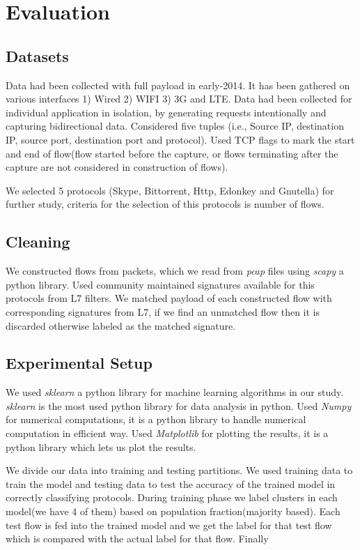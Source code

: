 \documentclass[conference]{IEEEtran}
\begin{document}
\section{Evaluation}
\label{sec:eval}
\subsection{Datasets}
Data had been collected with full payload in early-2014. It has been gathered on various interfaces 1) Wired 2) WIFI 3) 3G and LTE. Data had been collected for individual application in isolation, by generating requests intentionally and capturing bidirectional data.  Considered five tuples (i.e., Source IP, destination IP, source port, destination port and protocol). Used TCP flags to mark the start and end of flow(flow started before the capture, or flows terminating after the capture are not considered in construction of flows). 

We selected 5 protocols (Skype, Bittorrent, Http, Edonkey and Gnutella) for further study, criteria for the selection of this protocols is number of flows. 
\subsection{Cleaning}
We constructed flows from packets, which we read from \emph{pcap} files using \emph{scapy} a python library. Used community maintained signatures\cite{} available for this protocols from L7 filters. We matched payload of each constructed flow with corresponding signatures from L7, if we find an unmatched flow then it is discarded otherwise labeled as the matched signature.

\subsection{Experimental Setup}
We used \emph{sklearn} a python library for machine learning algorithms in our study. \emph{sklearn} is the most used python library for data analysis in python. Used \emph{Numpy} for numerical computations, it is a python library to handle numerical computation in efficient way. Used \emph{Matplotlib} for plotting the results, it is a python library which lets us plot the results. 

We divide our data into training and testing partitions. We used training data to train the model and testing data to test the accuracy of the trained model in correctly classifying protocols. 
During training phase we label clusters in each model(we have 4 of them) based on population fraction(majority based). Each test flow is fed into the trained model and we get the label for that test flow which is compared with the actual label for that flow. Finally 
\end{document}
